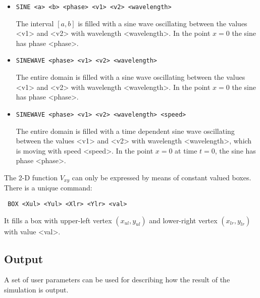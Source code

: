 \documentclass[a4paper,11pt]{article}
\begin{document}
\begin{itemize}
\begin{itemize}
  \item \begin{verbatim}SINE <a> <b> <phase> <v1> <v2> <wavelength> \end{verbatim}
    The interval $[a, b]$ is filled with a sine wave oscillating between the values <v1> and <v2> with wavelength <wavelength>. In the point $x = 0$ the sine has phase <phase>.
  \item \begin{verbatim}SINEWAVE <phase> <v1> <v2> <wavelength> \end{verbatim}
    The entire domain is filled with a sine wave oscillating between the values <v1> and <v2> with wavelength <wavelength>. In the point $x = 0$ the sine has phase <phase>.
  \item \begin{verbatim}SINEWAVE <phase> <v1> <v2> <wavelength> <speed> \end{verbatim}
    The entire domain is filled with a time dependent sine wave oscillating between the values <v1> and <v2> with wavelength <wavelength>, which is moving with speed <speed>. In the point $x = 0$ at time $t = 0$, the sine has phase <phase>.
\end{itemize}

The 2-D function $V_{xy}$ can only be expressed by means of constant valued boxes. There is a unique command:
\begin{verbatim} BOX <Xul> <Yul> <Xlr> <Ylr> <val> \end{verbatim}
  It fills a box with upper-left vertex $(x_{ul}, y_{ul})$ and lower-right vertex $(x_{lr}, y_{lr})$
  with value <val>.
\end{itemize}

\subsection{Output}
A set of user parameters can be used for describing how the result of the simulation is output.
\end{document}
